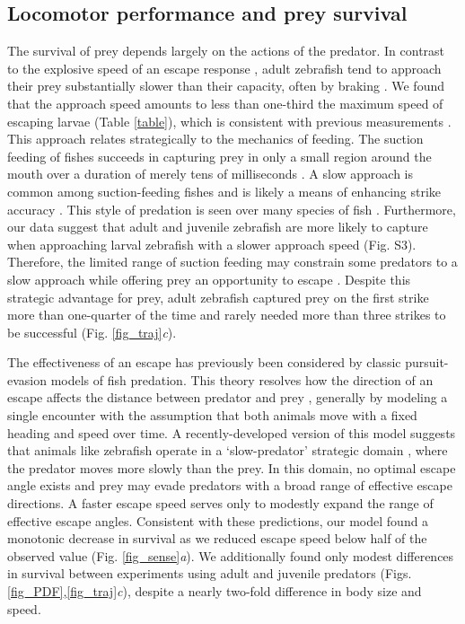 \documentclass[]{rsos}%
\begin{document}
\subsection{Locomotor performance and prey survival} 

The survival of prey depends largely on the actions of the predator.
In contrast to the explosive speed of an escape response \cite{Muller:2004hp}, adult zebrafish tend to approach their prey substantially slower than their capacity, often by braking \cite{McHenry:2005tc}.
We found that the approach speed amounts to less than one-third the maximum speed of escaping larvae (Table \ref{table}), which is consistent with previous measurements \cite{Stewart:2013bha}.
This approach relates strategically to the mechanics of feeding.
The suction feeding of fishes succeeds in capturing prey in only a small region around the mouth over a duration of merely tens of milliseconds \cite{FerryGraham:2003bz,Higham:2005kg,Holzman:2007p15907}.
A slow approach is common among suction-feeding fishes and is likely a means of enhancing strike accuracy \cite{Webb:1984jz,Higham:2007go}.
This style of predation is seen over many species of fish \cite{Higham:2007hy}.
Furthermore, our data suggest that adult and juvenile zebrafish are more likely to capture when approaching larval zebrafish with a slower approach speed (Fig. S3).
Therefore, the limited range of suction feeding may constrain some predators to a slow approach while offering prey an opportunity to escape \cite{Holzman:2009uu}.
Despite this strategic advantage for prey, adult zebrafish captured prey on the first strike more than one-quarter of the time and rarely needed more than three strikes to be successful (Fig. \ref{fig_traj}\textit{c}).

The effectiveness of an escape has previously been considered by classic pursuit-evasion models of fish predation.
This theory resolves how the direction of an escape affects the distance between predator and prey \cite{Isaacs:1965uz,Weihs:1984tb}, generally by modeling a single encounter with the assumption that both animals move with a fixed heading and speed over time. 
A recently-developed version of this model suggests that animals like zebrafish operate in a `slow-predator' strategic domain \cite{Soto:2015cj}, where the predator moves more slowly than the prey.
In this domain, no optimal escape angle exists and prey may evade predators with a broad range of effective escape directions.
A faster escape speed serves only to modestly expand the range of effective escape angles. 
Consistent with these predictions, our model found a monotonic decrease in survival as we reduced escape speed below half of the observed value (Fig. \ref{fig_sense}\textit{a}). 
We additionally found only modest differences in survival between experiments using adult and juvenile predators (Figs. \ref{fig_PDF},\ref{fig_traj}\textit{c}), despite a nearly two-fold difference in body size and speed.
\end{document}
